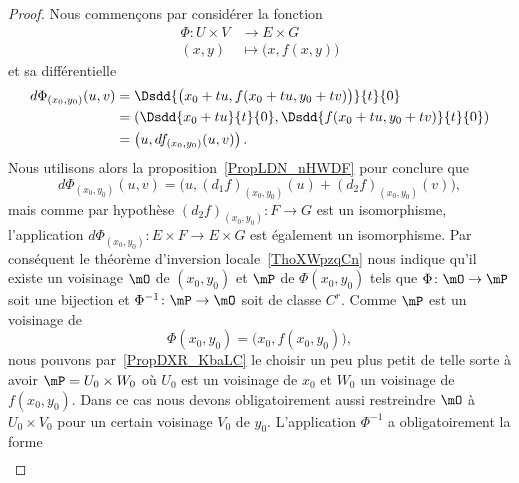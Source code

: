\begin{proof}
    Nous commençons par considérer la fonction
    \begin{equation}
        \begin{aligned}
            \Phi\colon U\times V  & \to E\times G \\
                        (x,y)     & \mapsto \big( x,f(x,y) \big)
        \end{aligned}
    \end{equation}
    et sa différentielle
    \begin{subequations}
        \begin{align}
            d\Phi_{(x_0,y_0)}(u,v)  & = \Dsdd{ \big( x_0+tu,f(x_0+tu,y_0+tv) \big) }{t}{0}                    \\
                                    & = \left( \Dsdd{ x_0+tu }{t}{0},\Dsdd{ f(x_0+tu,y_0+tv) }{t}{0} \right)  \\
                                    & = \left( u,df_{(x_0,y_0)}(u,v) \right).
        \end{align}
    \end{subequations}
    Nous utilisons alors la proposition~\ref{PropLDN_nHWDF} pour conclure que
    \begin{equation}
        d\Phi_{(x_0,y_0)}(u,v)=\big( u,(d_1f)_{(x_0,y_0)}(u)+(d_2f)_{(x_0,y_0)}(v) \big),
    \end{equation}
    mais comme par hypothèse \( (d_2f)_{(x_0,y_0)}\colon F\to G\) est un isomorphisme, l'application \( d\Phi_{(x_0,y_0)}\colon E\times F\to E\times G\) est également un isomorphisme. Par conséquent le théorème d'inversion locale~\ref{ThoXWpzqCn} nous indique qu'il existe un voisinage \( \mO\) de \( (x_0,y_0)\) et \( \mP\) de \( \Phi(x_0,y_0)\) tels que \( \Phi\colon \mO\to \mP\) soit une bijection et \( \Phi^{-1}\colon \mP\to \mO\) soit de classe \( C^r\). Comme \( \mP\) est un voisinage de
    \begin{equation}
        \Phi(x_0,y_0)=\big( x_0,f(x_0,y_0) \big),
    \end{equation}
    nous pouvons par~\ref{PropDXR_KbaLC} le choisir un peu plus petit de telle sorte à avoir \( \mP=U_0\times W_0\) où \( U_0\) est un voisinage de \( x_0\) et \( W_0\) un voisinage de \( f(x_0,y_0)\). Dans ce cas nous devons obligatoirement aussi restreindre \( \mO\) à \( U_0\times V_0\) pour un certain voisinage \( V_0\) de \( y_0\). L'application \( \Phi^{-1}\) a obligatoirement la forme
    \begin{equation}    \label{EqMHT_QrHRn}
        \begin{aligned}

\end{aligned}
\end{equation}
\end{proof}
